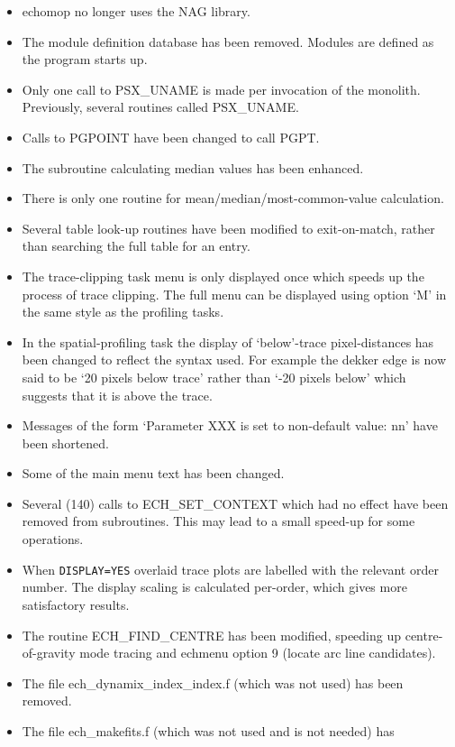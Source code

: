 \documentclass[11pt,twoside]{article}
\newcommand{\htmlref}[2]{#1}
\begin{document}
\begin{itemize}
\item {\sc echomop} no longer uses the NAG library.
\item The module definition database has been removed.  Modules are defined
   as the program starts up.
\item Only one call to PSX\_UNAME is made per invocation of the monolith.
   Previously, several routines called PSX\_UNAME.
\item Calls to PGPOINT have been changed to call PGPT.
\item The subroutine calculating median values has been enhanced.
\item There is only one routine for mean/median/most-common-value
   calculation.
\item Several table look-up routines have been modified to exit-on-match,
   rather than searching the full table for an entry.
\item The trace-clipping task menu is only displayed once which speeds
   up the process of trace clipping.  The full menu can be displayed
   using option `M' in the same style as the profiling tasks.
\item In the spatial-profiling task the display of `below'-trace
   pixel-distances has been changed to reflect the syntax used.  For
   example the dekker edge is now said to be `20 pixels below trace'
   rather than `-20 pixels below' which suggests that it is above the
   trace.
\item Messages of the form `Parameter XXX is set to non-default value: nn'
   have been shortened.
\item Some of the main menu text has been changed.
\item Several (140) calls to ECH\_SET\_CONTEXT which had no effect have been
   removed from subroutines.  This may lead to a small speed-up for
   some operations.
\item When \htmlref{{\tt{DISPLAY=YES}}}{par_DISPLAY} overlaid trace plots are
   labelled with the relevant
   order number.  The display scaling is calculated per-order, which gives
   more satisfactory results.
\item The routine ECH\_FIND\_CENTRE has been modified, speeding up
   centre-of-gravity mode tracing and echmenu option 9 (locate arc line
   candidates).
\item The file ech\_dynamix\_index\_index.f (which was not used) has been
   removed.
\item The file ech\_makefits.f (which was not used and is not needed) has

\end{itemize}
\end{document}
